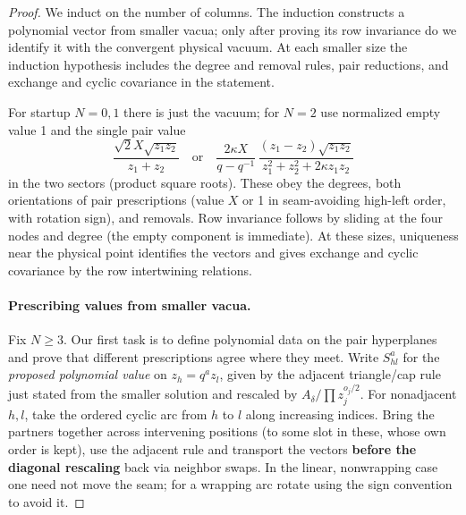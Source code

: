 \begin{proof}
We induct on the number of columns. The induction constructs a polynomial
vector from smaller vacua; only after proving its row invariance do we
identify it with the convergent physical vacuum. At each smaller size the
induction hypothesis includes the degree and removal rules, pair reductions,
and exchange and cyclic covariance in the statement.

For startup \(N=0,1\) there is just the vacuum; for \(N=2\) use normalized empty value 1 and the single pair value
\[
 \frac{\sqrt2 X\sqrt{z_1 z_2}}{z_1+z_2}
 \quad\text{or}\quad
 \frac{2\kappa X}{q-q^{-1}}\,
 \frac{(z_1-z_2)\sqrt{z_1 z_2}}{z_1^2+z_2^2+2\kappa z_1z_2}
\]
in the two sectors (product square roots). These obey the degrees, both orientations of pair prescriptions (value \(X\) or 1 in seam-avoiding high-left order, with rotation sign), and removals. Row invariance follows by sliding at the four nodes and degree (the empty component is immediate). At these sizes, uniqueness near the physical point identifies the vectors and gives exchange and cyclic covariance by the row intertwining relations.

\paragraph{Prescribing values from smaller vacua.}
Fix $N\ge3$. Our first task is to define polynomial data on the pair
hyperplanes and prove that different prescriptions agree where they meet.
Write \(S_{hl}^a\) for the \emph{proposed polynomial value} on \(z_h=q^a z_l\), given by the adjacent triangle/cap rule just stated from the smaller solution and rescaled by \(A_\delta/\prod z_j^{o_j/2}\). For nonadjacent \(h,l\), take the ordered cyclic arc from \(h\) to \(l\) along increasing indices. Bring the partners together across intervening positions (to some slot in these, whose own order is kept), use the adjacent rule and transport the vectors \textbf{before the diagonal rescaling} back via neighbor swaps. In the linear, nonwrapping case one need not move the seam; for a wrapping arc rotate using the sign convention to avoid it.


\end{proof}
